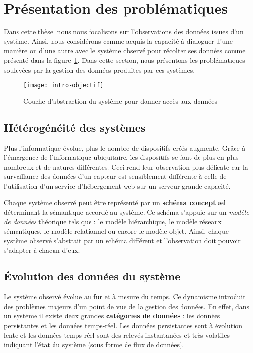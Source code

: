 \section{Présentation des problématiques}\label{sec:intro:problematique}
Dans cette thèse, nous nous focalisons sur l'observations des données issues d'un système. Ainsi, nous considérons comme acquis la capacité à dialoguer d'une manière ou d'une autre avec le système observé pour récolter ses données comme présenté dans la figure~\ref{fig:intro:objectif:abstraction}. Dans cette section, nous présentons les problématiques soulevées par la gestion des données produites par ces systèmes.

\begin{figure}[ht]
\centering
\texttt{[image: intro-objectif]}
\caption{Couche d'abstraction du système pour donner accès aux données}\label{fig:intro:objectif:abstraction}
\end{figure}

\subsection{Hétérogénéité des systèmes}
Plus l'informatique évolue, plus le nombre de dispositifs créés augmente. Grâce à l'émergence de l'informatique ubiquitaire, les dispositifs se font de plus en plus nombreux et de natures différentes. Ceci rend leur observation plus délicate car la surveillance des données d'un capteur est sensiblement différente à celle de l'utilisation d'un service d'hébergement web sur un serveur grande capacité.

Chaque système observé peut être représenté par un \textbf{schéma conceptuel} déterminant la sémantique accordé au système. Ce schéma s'appuie sur un \textit{modèle de données} théorique tels que : le modèle hiérarchique, le modèle réseaux sémantiques, le modèle relationnel ou encore le modèle objet. Ainsi, chaque système observé s'abstrait par un schéma différent et l'observation doit pouvoir s'adapter à chacun d'eux.

\subsection{Évolution des données du système}
Le système observé évolue au fur et à mesure du temps. Ce dynamisme introduit des problèmes majeurs d'un point de vue de la gestion des données. En effet, dans un système il existe deux grandes \textbf{catégories de données} : les données persistantes et les données temps-réel. Les données persistantes sont à évolution lente et les données temps-réel sont des relevés instantanées et très volatiles indiquant l'état du système (sous forme de flux de données).

